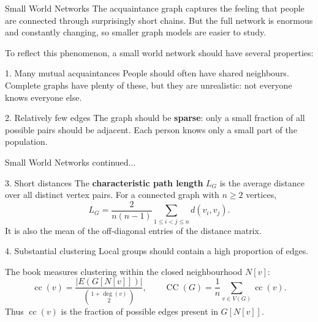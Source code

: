 \documentclass[aspectratio=169,11pt]{beamer}
\begin{document}
\begin{frame}[t]{Small World Networks}
The acquaintance graph captures the feeling that people are connected through surprisingly short chains. But the full network is enormous and constantly changing, so smaller graph models are easier to study.

\medskip
To reflect this phenomenon, a small world network should have several properties:

\begin{block}{1. Many mutual acquaintances}
People should often have shared neighbours. Complete graphs have plenty of these, but they are unrealistic: not everyone knows everyone else.
\end{block}

\medskip
\begin{block}{2. Relatively few edges}
The graph should be \textbf{sparse}: only a small fraction of all possible pairs should be adjacent. Each person knows only a small part of the population.
\end{block}
\end{frame}

\begin{frame}[t]{Small World Networks continued...}
\begin{block}{3. Short distances}
\small\setlength{\abovedisplayskip}{5pt}\setlength{\belowdisplayskip}{5pt}
The \textbf{characteristic path length} $L_G$ is the average distance over all distinct vertex pairs. For a connected graph with $n\geq 2$ vertices,
\[
L_G=\frac{2}{n(n-1)}\sum_{1\leq i<j\leq n}d(v_i,v_j).
\]
It is also the mean of the off-diagonal entries of the distance matrix.
\end{block}

\begin{block}{4. Substantial clustering}
\small\setlength{\abovedisplayskip}{5pt}\setlength{\belowdisplayskip}{5pt}
Local groups should contain a high proportion of edges.

\smallskip
The book measures clustering within the closed neighbourhood $N[v]$:
\[
\operatorname{cc}(v)=\frac{|E(G[N[v]])|}{\binom{1+\deg(v)}{2}},
\qquad
\operatorname{CC}(G)=\frac{1}{n}\sum_{v\in V(G)}\operatorname{cc}(v).
\]
Thus $\operatorname{cc}(v)$ is the fraction of possible edges present in $G[N[v]]$.
\end{block}

\end{frame}
\end{document}
